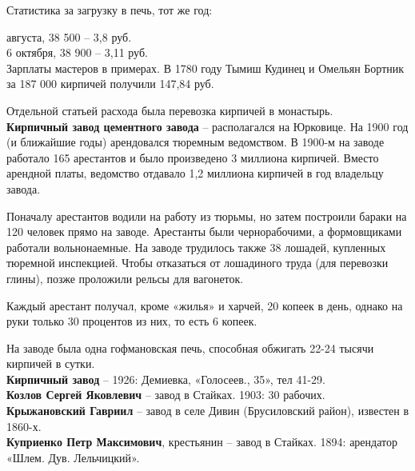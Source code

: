 Статистика за загрузку в печь, тот же год:

 августа, 38 500 – 3,8 руб.\\
6 октября, 38 900 – 3,11 руб.\\
 
Зарплаты мастеров в примерах. В 1780 году Тымиш Кудинец и Омельян Бортник за 187 000 кирпичей получили 147,84 руб.

Отдельной статьей расхода была перевозка кирпичей в монастырь.\\

\noindent\textbf{Кирпичный завод цементного завода} – располагался на Юрковице. На 1900 год (и ближайшие годы) арендовался тюремным ведомством. В 1900-м на заводе работало 165 арестантов и было произведено 3 миллиона кирпичей. Вместо арендной платы, ведомство отдавало 1,2 миллиона кирпичей в год владельцу завода.

Поначалу арестантов водили на работу из тюрьмы, но затем построили бараки на 120 человек прямо на заводе. Арестанты были чернорабочими, а формовщиками работали вольнонаемные. На заводе трудилось также 38 лошадей, купленных тюремной инспекцией. Чтобы отказаться от лошадиного труда (для перевозки глины), позже проложили рельсы для вагонеток.

Каждый арестант получал, кроме «жилья» и харчей, 20 копеек в день, однако на руки только 30 процентов из них, то есть 6 копеек. 

На заводе была одна гофмановская печь, способная обжигать 22-24 тысячи кирпичей в сутки.\\


\noindent\textbf{Кирпичный завод} – 1926: Демиевка, «Голосеев., 35», тел 41-29.\\



\noindent\textbf{Козлов Сергей Яковлевич} – завод в Стайках. 1903: 30 рабочих.\\

\noindent\textbf{Крыжановский Гавриил} – завод в селе Дивин (Брусиловский район), известен в 1860-х.\\

\noindent\textbf{Куприенко Петр Максимович}, крестьянин – завод в Стайках. 1894: арендатор «Шлем. Дув. Лельчицкий».\\


